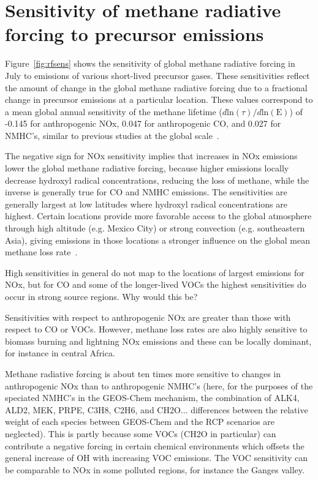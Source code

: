 \section{Sensitivity of methane radiative forcing to precursor emissions}

Figure~\ref{fig:rfsens} shows the sensitivity of global methane radiative forcing in July to emissions of various short-lived precursor gases. These sensitivities reflect the amount of change in the global methane radiative forcing due to a fractional change in precursor emissions at a particular location. These values correspond to a mean global annual sensitivity of the methane lifetime ($d \mathrm{ln}(\tau)/d \mathrm{ln}(\mathrm{E})$) of -0.145 for anthropogenic NOx, 0.047 for anthropogenic CO, and 0.027 for NMHC's, similar to previous studies at the global scale~\citep{ref:fry2012,ref:holmes2013}.

The negative sign for NOx sensitivity implies that increases in NOx emissions lower the global methane radiative forcing, because higher emissions locally decrease hydroxyl radical concentrations, reducing the loss of methane, while the inverse is generally true for CO and NMHC emissions. The sensitivities are generally largest at low latitudes where hydroxyl radical concentrations are highest. Certain locations provide more favorable access to the global atmosphere through high altitude (e.g. Mexico City) or strong convection (e.g. southeastern Asia), giving emissions in those locations a stronger influence on the global mean methane loss rate~\citep{ref:bowman2012}.

High sensitivities in general do not map to the locations of largest emissions for NOx, but for CO and some of the longer-lived VOCs the highest sensitivities do occur in strong source regions. Why would this be?

Sensitivities with respect to anthropogenic NOx are greater than those with respect to CO or VOCs. However, methane loss rates are also highly sensitive to biomass burning and lightning NOx emissions and these can be locally dominant, for instance in central Africa.

Methane radiative forcing is about ten times more sensitive to changes in anthropogenic NOx than to anthropogenic NMHC's (here, for the purposes of the speciated NMHC's in the GEOS-Chem mechanism, the combination of ALK4, ALD2, MEK, PRPE, C3H8, C2H6, and CH2O... differences between the relative weight of each species between GEOS-Chem and the RCP scenarios are neglected). This is partly because some VOCs (CH2O in particular) can contribute a negative forcing in certain chemical environments which offsets the general increase of OH with increasing VOC emissions. The VOC sensitivity can be comparable to NOx in some polluted regions, for instance the Ganges valley.

